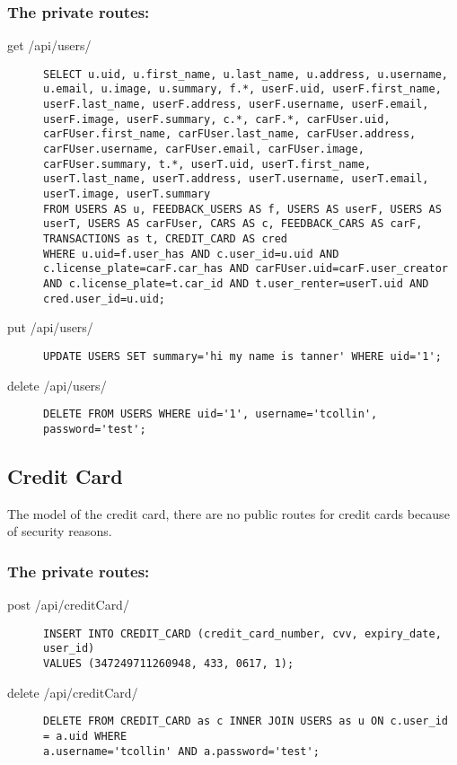 \documentclass{article}
\begin{document}
\subsubsection{The private routes:}
\begin{description}
\item[get /api/users/] \mbox{}
\begin{lstlisting}[style=sql]
SELECT u.uid, u.first_name, u.last_name, u.address, u.username, u.email, u.image, u.summary, f.*, userF.uid, userF.first_name, userF.last_name, userF.address, userF.username, userF.email, userF.image, userF.summary, c.*, carF.*, carFUser.uid, carFUser.first_name, carFUser.last_name, carFUser.address, carFUser.username, carFUser.email, carFUser.image, carFUser.summary, t.*, userT.uid, userT.first_name, userT.last_name, userT.address, userT.username, userT.email, userT.image, userT.summary
FROM USERS AS u, FEEDBACK_USERS AS f, USERS AS userF, USERS AS userT, USERS AS carFUser, CARS AS c, FEEDBACK_CARS AS carF, TRANSACTIONS as t, CREDIT_CARD AS cred
WHERE u.uid=f.user_has AND c.user_id=u.uid AND c.license_plate=carF.car_has AND carFUser.uid=carF.user_creator AND c.license_plate=t.car_id AND t.user_renter=userT.uid AND cred.user_id=u.uid;
\end{lstlisting}

\item[put /api/users/] \mbox{}
\begin{lstlisting}[style=sql]
UPDATE USERS SET summary='hi my name is tanner' WHERE uid='1';
\end{lstlisting}

\item[delete /api/users/] \mbox{}
\begin{lstlisting}[style=sql]
DELETE FROM USERS WHERE uid='1', username='tcollin', password='test';
\end{lstlisting}
\end{description}

\subsection{Credit Card}
The model of the credit card, there are no public routes for credit cards because of security reasons.

\subsubsection{The private routes:}
\begin{description}
\item[post /api/creditCard/] \mbox{}
\begin{lstlisting}[style=sql]
INSERT INTO CREDIT_CARD (credit_card_number, cvv, expiry_date, user_id)
VALUES (347249711260948, 433, 0617, 1);
\end{lstlisting}

\item[delete /api/creditCard/] \mbox{}
\begin{lstlisting}[style=sql]
DELETE FROM CREDIT_CARD as c INNER JOIN USERS as u ON c.user_id = a.uid WHERE
a.username='tcollin' AND a.password='test';
\end{lstlisting}
\end{description}
\end{document}
